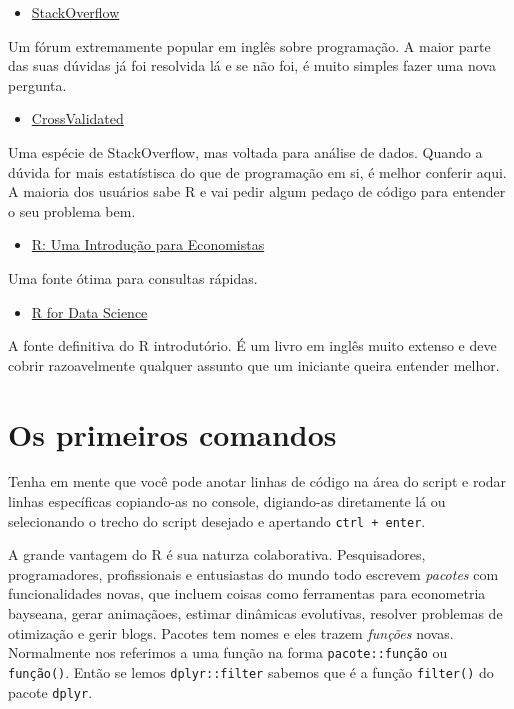 \documentclass[]{article}
\providecommand{\tightlist}{%
  \setlength{\itemsep}{0pt}\setlength{\parskip}{0pt}}
\begin{document}
\begin{itemize}
\tightlist
\item
  \href{https://stackoverflow.com/}{StackOverflow}
\end{itemize}

Um fórum extremamente popular em inglês sobre programação. A maior parte
das suas dúvidas já foi resolvida lá e se não foi, é muito simples fazer
uma nova pergunta.

\begin{itemize}
\tightlist
\item
  \href{https://stats.stackexchange.com/}{CrossValidated}
\end{itemize}

Uma espécie de StackOverflow, mas voltada para análise de dados. Quando
a dúvida for mais estatístisca do que de programação em si, é melhor
conferir aqui. A maioria dos usuários sabe R e vai pedir algum pedaço de
código para entender o seu problema bem.

\begin{itemize}
\tightlist
\item
  \href{https://danmrc.github.io/R-para-Economistas/}{R: Uma Introdução
  para Economistas}
\end{itemize}

Uma fonte ótima para consultas rápidas.

\begin{itemize}
\tightlist
\item
  \href{https://r4ds.had.co.nz}{R for Data Science}
\end{itemize}

A fonte definitiva do R introdutório. É um livro em inglês muito extenso
e deve cobrir razoavelmente qualquer assunto que um iniciante queira
entender melhor.

\hypertarget{os-primeiros-comandos}{%
\section{Os primeiros comandos}\label{os-primeiros-comandos}}

Tenha em mente que você pode anotar linhas de código na área do script e
rodar linhas específicas copiando-as no console, digiando-as diretamente
lá ou selecionando o trecho do script desejado e apertando
\texttt{ctrl\ +\ enter}.

A grande vantagem do R é sua naturza colaborativa. Pesquisadores,
programadores, profissionais e entusiastas do mundo todo escrevem
\emph{pacotes} com funcionalidades novas, que incluem coisas como
ferramentas para econometria bayseana, gerar animaçãoes, estimar
dinâmicas evolutivas, resolver problemas de otimização e gerir blogs.
Pacotes tem nomes e eles trazem \emph{funções} novas. Normalmente nos
referimos a uma função na forma \texttt{pacote::função} ou
\texttt{função()}. Então se lemos \texttt{dplyr::filter} sabemos que é a
função \texttt{filter()} do pacote \texttt{dplyr}.
\end{document}
